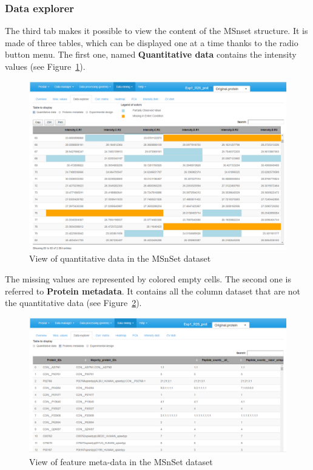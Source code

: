 \documentclass[12pt]{article}
\begin{document}
\subsubsection {Data explorer}\label{sec:dataexplorer}
The third tab %
makes it possible to view the content of the MSnset structure. It is made of three tables, which can be displayed one at a time thanks to the radio button menu. The first one, named \textbf{Quantitative data} contains the intensity values (see Figure~\ref{fig:sdqv1}). 

\begin {figure}
\includegraphics[width=\textwidth]{images/desc_quantiData.png}
\caption{View of quantitative data in the MSnSet dataset}\label{fig:sdqv1}
\end {figure}

The missing values are represented by colored empty cells. The second one is referred to \textbf{Protein metadata}. It contains all the column dataset that are not the quantitative data (see Figure~\ref{fig:sdqv2}). 

\begin {figure}
\includegraphics[width=\textwidth]{images/desc_fdata.png}
\caption{View of feature meta-data in the MSnSet dataset}\label{fig:sdqv2}
\end {figure}
\end{document}

